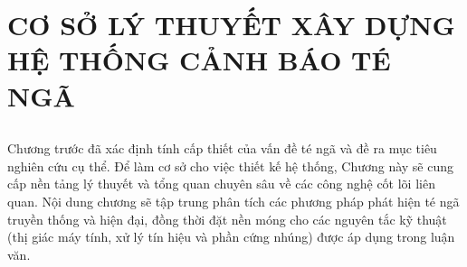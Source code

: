 \chapter[CƠ SỞ LÝ THUYẾT]{CƠ SỞ LÝ THUYẾT XÂY DỰNG HỆ THỐNG CẢNH BÁO TÉ NGÃ} 
\label{chap:theoretical_basis} %

\section*{} %
Chương trước đã xác định tính cấp thiết của vấn đề té ngã và đề ra mục tiêu nghiên cứu cụ thể. Để làm cơ sở cho việc thiết kế hệ thống, Chương này sẽ cung cấp nền tảng lý thuyết và tổng quan chuyên sâu về các công nghệ cốt lõi liên quan. Nội dung chương sẽ tập trung phân tích các phương pháp phát hiện té ngã truyền thống và hiện đại, đồng thời đặt nền móng cho các nguyên tắc kỹ thuật (thị giác máy tính, xử lý tín hiệu và phần cứng nhúng) được áp dụng trong luận văn.







